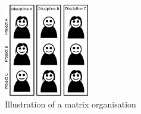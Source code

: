 \begin{figure}[!htp]
    \centering
    \includegraphics[width=0.33\textwidth]{images/matrixorga.png}
    \caption[Matrix Organisation]{Illustration of a matrix organisation}
    \label{fig:matrixorga}
\end{figure}
